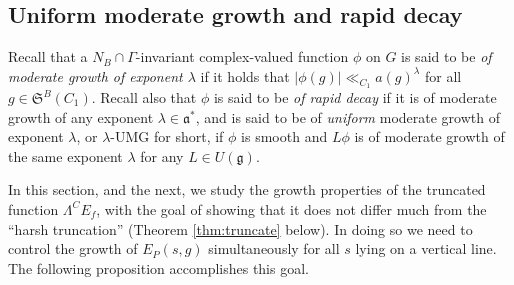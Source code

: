 \documentclass[11pt]{amsart}
\numberwithin{theorem}{section}
\numberwithin{equation}{section}
\theoremstyle{remark}
\theoremstyle{definition}
\newcommand{\Lg}{\mathfrak{g}}
\begin{document}
\subsection{Uniform moderate growth and rapid decay}

Recall that a $N_B \cap \Gamma$-invariant complex-valued function $\phi$ on $G$ is said to be \emph{of moderate growth of exponent $\lambda$} if it holds that $|\phi(g)| \ll_{C_1} a(g)^\lambda$ for all $g \in \mathfrak S^B(C_1)$. Recall also that $\phi$ is said to be \emph{of rapid decay} if it is of moderate growth of any exponent $\lambda \in \mathfrak a^*$, and is said to be of \emph{uniform} moderate growth of exponent $\lambda$, or $\lambda$-UMG for short, if $\phi$ is smooth and $L\phi$ is of moderate growth of the same exponent $\lambda$ for any $L \in U(\Lg)$.

In this section, and the next, we study the growth properties of the truncated function $\Lambda^CE_f$, with the goal of showing that it does not differ much from the ``harsh truncation'' (Theorem \ref{thm:truncate} below). In doing so we need to control the growth of $E_P(s,g)$ simultaneously for all $s$ lying on a vertical line. The following proposition accomplishes this goal.
\end{document}
